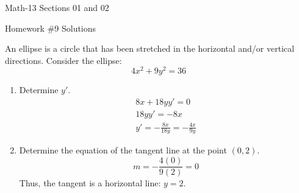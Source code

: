 \documentclass[letterpaper,12pt,fleqn]{article}
\begin{document}
\begin{center}
  \large
  Math-13 Sections 01 and 02

  \Large
  Homework \#9 Solutions
\end{center}

\vspace{0.5in}

An ellipse is a circle that has been stretched in the horizontal and/or vertical directions.  Consider the
ellipse:
\[4x^2+9y^2=36\]
\begin{enumerate}[left=0in]
\item Determine \(y'\).
  \begin{gather*}
    8x+18yy'=0 \\
    18yy'=-8x \\
    y'=-\frac{8x}{18y}=-\frac{4x}{9y}
  \end{gather*}
\item Determine the equation of the tangent line at the point \((0,2)\).
  \[m=-\frac{4(0)}{9(2)}=0\]
  Thus, the tangent is a horizontal line: \(y=2\).
\end{enumerate}
\end{document}
